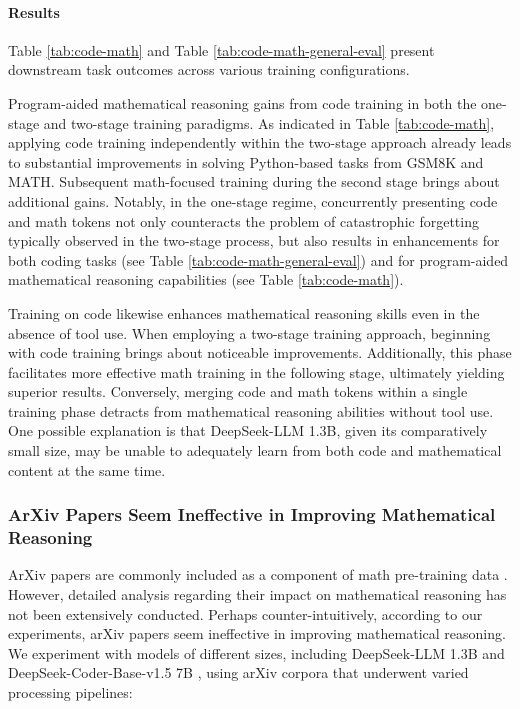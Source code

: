 \begin{itemize}[topsep=0pt]
\paragraph{Results}
Table \ref{tab:code-math} and Table \ref{tab:code-math-general-eval} present downstream task outcomes across various training configurations.

Program-aided mathematical reasoning gains from code training in both the one-stage and two-stage training paradigms. As indicated in Table \ref{tab:code-math}, applying code training independently within the two-stage approach already leads to substantial improvements in solving Python-based tasks from GSM8K and MATH. Subsequent math-focused training during the second stage brings about additional gains. Notably, in the one-stage regime, concurrently presenting code and math tokens not only counteracts the problem of catastrophic forgetting typically observed in the two-stage process, but also results in enhancements for both coding tasks (see Table \ref{tab:code-math-general-eval}) and for program-aided mathematical reasoning capabilities (see Table \ref{tab:code-math}).

Training on code likewise enhances mathematical reasoning skills even in the absence of tool use. When employing a two-stage training approach, beginning with code training brings about noticeable improvements. Additionally, this phase facilitates more effective math training in the following stage, ultimately yielding superior results. Conversely, merging code and math tokens within a single training phase detracts from mathematical reasoning abilities without tool use. One possible explanation is that DeepSeek-LLM 1.3B, given its comparatively small size, may be unable to adequately learn from both code and mathematical content at the same time.

\subsubsection{ArXiv Papers Seem Ineffective in Improving Mathematical Reasoning}

ArXiv papers are commonly included as a component of math pre-training data \citep{minerva,gpt-f,llemma,mathpile}. However, detailed analysis regarding their impact on mathematical reasoning has not been extensively conducted. Perhaps counter-intuitively, according to our experiments, arXiv papers seem ineffective in improving mathematical reasoning. We experiment with models of different sizes, including DeepSeek-LLM 1.3B and DeepSeek-Coder-Base-v1.5 7B \citep{deepseek-coder}, using arXiv corpora that underwent varied processing pipelines:


\end{itemize}
